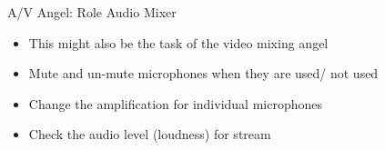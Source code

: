 
\begin{frame}{A/V Angel: Role Audio Mixer}
	\begin{itemize}
		\item This might also be the task of the video mixing angel
		\item Mute and un-mute microphones when they are used/ not used
		\item Change the amplification for individual microphones
		\item Check the audio level (loudness) for stream
	\end{itemize}
\end{frame}
